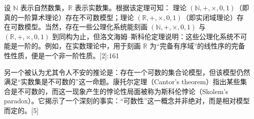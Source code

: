 设 \(\mathbb{N}\) 表示自然数集，\(\mathbb{R}\) 表示实数集。根据该定理可知：
理论 \((\mathbb{N}, +, \times, 0, 1)\)（即真的一阶算术理论）存在不可数模型；理论 \((\mathbb{R}, +, \times, 0, 1)\)（即实闭域理论）存在可数模型。当然，存在一些公理化系统能刻画 \((\mathbb{N}, +, \times, 0, 1)\) 与 \((\mathbb{R}, +, \times, 0, 1)\) 到同构为止，但洛文海姆–斯科伦定理说明：这些公理化系统不可能是一阶的。例如，在实数理论中，用于刻画 \(\mathbb{R}\) 为“完备有序域”的线性序的完备性性质，便是一个非一阶性质。[2]:161

另一个被认为尤其令人不安的推论是：存在一个可数的集合论模型，但该模型仍然满足“实数集是不可数的”这一命题。康托尔定理（Cantor’s theorem）指出某些集合是不可数的，而这一现象产生的悖论性局面被称为斯科伦悖论（Skolem’s paradox）。它揭示了一个深刻的事实：“可数性”这一概念并非绝对，而是相对模型而定的。[5]

